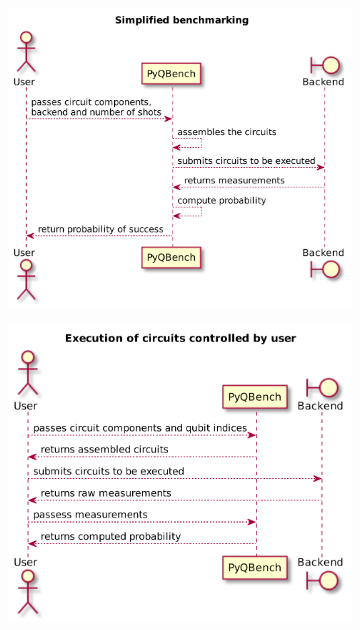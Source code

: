 \documentclass[preprint,12pt, a4paper, dvipsnames]{elsarticle}
\newcommand{\1}{{\rm 1\hspace{-0.9mm}l}}
\begin{document}
\begin{figure}
	\centering
	\begin{subfigure}[b]{\textwidth}
		\centering
		\includegraphics[width=1\textwidth]{pics/scheme1}
		\label{fig:simplified}
	\end{subfigure}
	\vfill
	\begin{subfigure}[b]{\textwidth}
		\centering
	\includegraphics[width=1\textwidth]{pics/scheme2}
		\label{fig:execution}
	\end{subfigure}
\end{figure}
\end{document}
